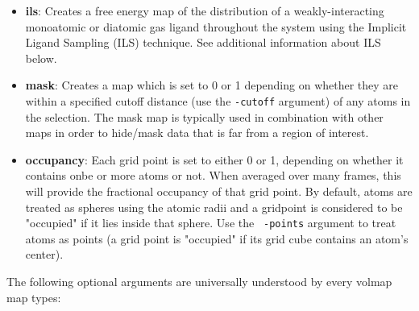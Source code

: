 \begin{itemize}
  \item {\bf ils}: Creates a free energy map of the distribution of
  a weakly-interacting monoatomic or diatomic gas ligand throughout the
  system using the Implicit Ligand Sampling (ILS) technique.
  See additional information about ILS below.

  \item {\bf mask}: Creates a map which is set to 0 or 1 depending on whether
  they are within a specified cutoff distance (use the {\tt -cutoff} argument)
  of any atoms in the selection. The mask map is typically used in combination
  with other maps in order to hide/mask data that is far from a region of
  interest.

  \item {\bf occupancy}: Each grid point is set to either 0 or 1, depending on
  whether it contains onbe or more atoms or not. When averaged over many frames,
  this will provide the fractional occupancy of that grid point. By default,
  atoms are treated as spheres using the atomic radii and a gridpoint is
  considered to be "occupied" if it lies inside that sphere. Use the {\tt
  -points} argument to treat atoms as points (a grid point is "occupied" if its
  grid cube contains an atom's center).

\end{itemize} 

The following optional arguments are universally understood by every volmap map types:   
      

